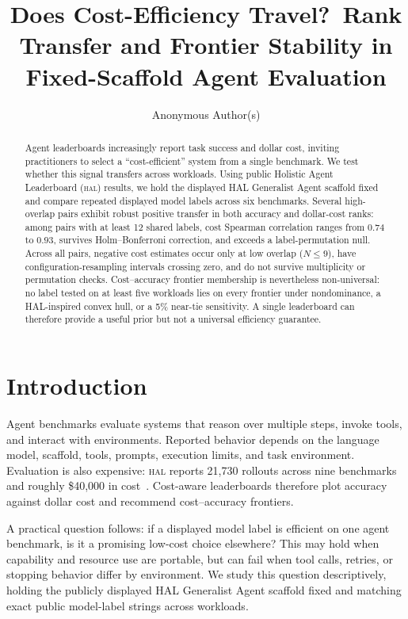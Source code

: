 \documentclass{article}
\title{Does Cost-Efficiency Travel?\
Rank Transfer and Frontier Stability in Fixed-Scaffold Agent Evaluation}
\author{Anonymous Author(s)}
\newcommand{\hal}{\textsc{hal}}
\begin{document}
\maketitle

\begin{abstract}
Agent leaderboards increasingly report task success and dollar cost, inviting practitioners to select a ``cost-efficient'' system from a single benchmark. We test whether this signal transfers across workloads. Using public Holistic Agent Leaderboard (\hal) results, we hold the displayed HAL Generalist Agent scaffold fixed and compare repeated displayed model labels across six benchmarks. Several high-overlap pairs exhibit robust positive transfer in both accuracy and dollar-cost ranks: among pairs with at least 12 shared labels, cost Spearman correlation ranges from $0.74$ to $0.93$, survives Holm--Bonferroni correction, and exceeds a label-permutation null. Across all pairs, negative cost estimates occur only at low overlap ($N\leq9$), have configuration-resampling intervals crossing zero, and do not survive multiplicity or permutation checks. Cost--accuracy frontier membership is nevertheless non-universal: no label tested on at least five workloads lies on every frontier under nondominance, a HAL-inspired convex hull, or a 5\% near-tie sensitivity. A single leaderboard can therefore provide a useful prior but not a universal efficiency guarantee.
\end{abstract}

\section{Introduction}

Agent benchmarks evaluate systems that reason over multiple steps, invoke tools, and interact with environments. Reported behavior depends on the language model, scaffold, tools, prompts, execution limits, and task environment. Evaluation is also expensive: \hal{} reports 21,730 rollouts across nine benchmarks and roughly \$40,000 in cost~\citep{kapoor2026hal}. Cost-aware leaderboards therefore plot accuracy against dollar cost and recommend cost--accuracy frontiers.

A practical question follows: if a displayed model label is efficient on one agent benchmark, is it a promising low-cost choice elsewhere? This may hold when capability and resource use are portable, but can fail when tool calls, retries, or stopping behavior differ by environment. We study this question descriptively, holding the publicly displayed HAL Generalist Agent scaffold fixed and matching exact public model-label strings across workloads.
\end{document}
